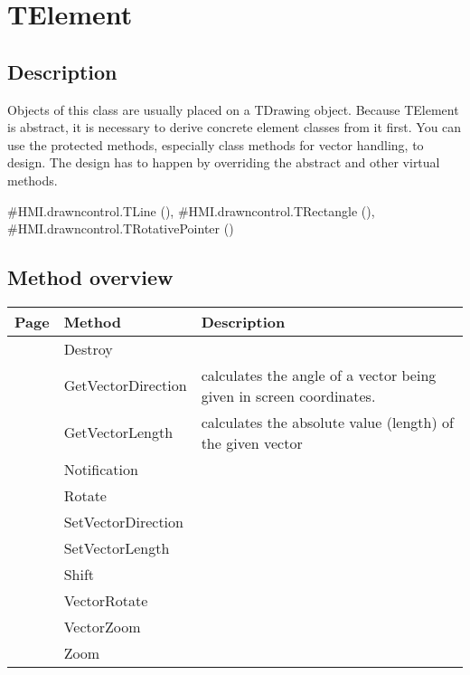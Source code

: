 \section{TElement}
\label{hmi:drawncontrol:telement}
\subsection{Description}
Objects of this class are usually placed on a TDrawing object. Because TElement is abstract, it is necessary to derive concrete element classes from it first. You can use the protected methods, especially class methods for vector handling, to design. The design has to happen by overriding the abstract and other virtual methods. 
\begin{FPCList}
\SeeAlso
\#HMI.drawncontrol.TLine (\pageref{hmi:drawncontrol:tline}),
\#HMI.drawncontrol.TRectangle (\pageref{hmi:drawncontrol:trectangle}),
\#HMI.drawncontrol.TRotativePointer (\pageref{hmi:drawncontrol:trotativepointer})\end{FPCList}
\subsection{Method overview}
\label{hmi:drawncontrol:telement:methods}
\begin{tabularx}{\textwidth}{llX}
Page & Method & Description  \\ \hline
\pageref{hmi:drawncontrol:telement:destroy} & Destroy  &  \\
\pageref{hmi:drawncontrol:telement:getvectordirection} & GetVectorDirection  & calculates the angle of a vector being given in screen coordinates.  \\
\pageref{hmi:drawncontrol:telement:getvectorlength} & GetVectorLength  & calculates the absolute value (length) of the given vector \\
\pageref{hmi:drawncontrol:telement:notification} & Notification  &  \\
\pageref{hmi:drawncontrol:telement:rotate} & Rotate  &  \\
\pageref{hmi:drawncontrol:telement:setvectordirection} & SetVectorDirection  &  \\
\pageref{hmi:drawncontrol:telement:setvectorlength} & SetVectorLength  &  \\
\pageref{hmi:drawncontrol:telement:shift} & Shift  &  \\
\pageref{hmi:drawncontrol:telement:vectorrotate} & VectorRotate  &  \\
\pageref{hmi:drawncontrol:telement:vectorzoom} & VectorZoom  &  \\
\pageref{hmi:drawncontrol:telement:zoom} & Zoom  &  \\
\hline
\end{tabularx}
